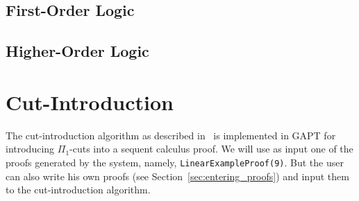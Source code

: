 \documentclass[a4paper,11pt]{article}
\begin{document}
\subsection{First-Order Logic}


\subsection{Higher-Order Logic}


\section{Cut-Introduction}

The cut-introduction algorithm as described in~\cite{Hetzl2012,Hetzl14Algorithmic,Hetzl14Introducing} is
implemented in GAPT for introducing $\Pi_1$-cuts into a sequent calculus
proof. We will use as input one of the proofs generated by
the system, namely, \texttt{LinearExampleProof(9)}. But the user can also
write his own proofs (see Section~\ref{sec:entering_proofs})
and input them to the cut-introduction algorithm.
\end{document}
